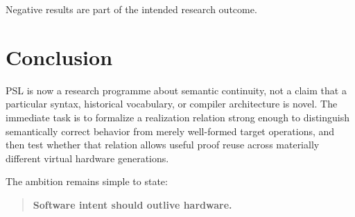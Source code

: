 \documentclass[11pt,a4paper]{article}
\begin{document}
Negative results are part of the intended research outcome.

\section{Conclusion}

PSL is now a research programme about semantic continuity, not a claim that a
particular syntax, historical vocabulary, or compiler architecture is novel.
The immediate task is to formalize a realization relation strong enough to
distinguish semantically correct behavior from merely well-formed target
operations, and then test whether that relation allows useful proof reuse
across materially different virtual hardware generations.

The ambition remains simple to state:

\begin{quote}
\textbf{Software intent should outlive hardware.}
\end{quote}



\end{document}
